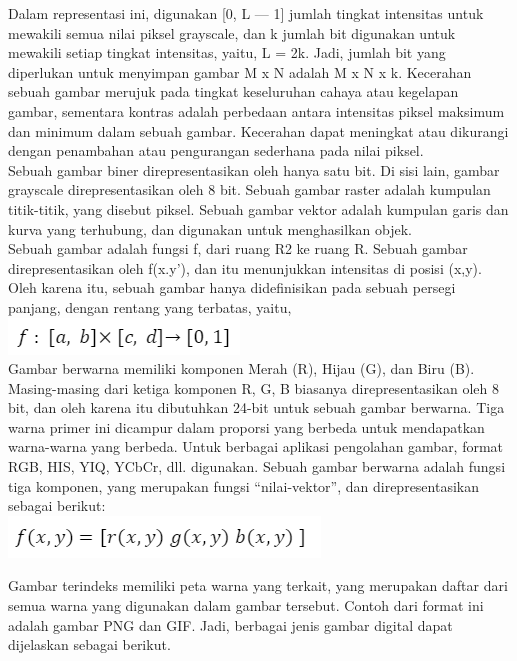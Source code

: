 \documentclass[
  letterpaper,
  DIV=11,
  numbers=noendperiod]{scrreprt}
\begin{document}
Dalam representasi ini, digunakan {[}0, L --- 1{]} jumlah tingkat
intensitas untuk mewakili semua nilai piksel grayscale, dan k jumlah bit
digunakan untuk mewakili setiap tingkat intensitas, yaitu, L = 2k. Jadi,
jumlah bit yang diperlukan untuk menyimpan gambar M x N adalah M x N x
k. Kecerahan sebuah gambar merujuk pada tingkat keseluruhan cahaya atau
kegelapan gambar, sementara kontras adalah perbedaan antara intensitas
piksel maksimum dan minimum dalam sebuah gambar. Kecerahan dapat
meningkat atau dikurangi dengan penambahan atau pengurangan sederhana
pada nilai piksel.\\
Sebuah gambar biner direpresentasikan oleh hanya satu bit. Di sisi lain,
gambar grayscale direpresentasikan oleh 8 bit. Sebuah gambar raster
adalah kumpulan titik-titik, yang disebut piksel. Sebuah gambar vektor
adalah kumpulan garis dan kurva yang terhubung, dan digunakan untuk
menghasilkan objek.\\
Sebuah gambar adalah fungsi f, dari ruang R2 ke ruang R. Sebuah gambar
direpresentasikan oleh f(x.y'), dan itu menunjukkan intensitas di posisi
(x,y). Oleh karena itu, sebuah gambar hanya didefinisikan pada sebuah
persegi panjang, dengan rentang yang terbatas, yaitu,\\
\includegraphics{Asset/image1111.png}\\
Gambar berwarna memiliki komponen Merah (R), Hijau (G), dan Biru (B).
Masing-masing dari ketiga komponen R, G, B biasanya direpresentasikan
oleh 8 bit, dan oleh karena itu dibutuhkan 24-bit untuk sebuah gambar
berwarna. Tiga warna primer ini dicampur dalam proporsi yang berbeda
untuk mendapatkan warna-warna yang berbeda. Untuk berbagai aplikasi
pengolahan gambar, format RGB, HIS, YIQ, YCbCr, dll. digunakan. Sebuah
gambar berwarna adalah fungsi tiga komponen, yang merupakan fungsi
``nilai-vektor'', dan direpresentasikan sebagai berikut:\\
\includegraphics{Asset/image1112.png}

Gambar terindeks memiliki peta warna yang terkait, yang merupakan daftar
dari semua warna yang digunakan dalam gambar tersebut. Contoh dari
format ini adalah gambar PNG dan GIF. Jadi, berbagai jenis gambar
digital dapat dijelaskan sebagai berikut.
\end{document}
